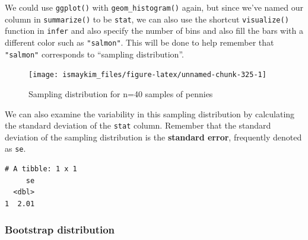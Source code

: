 \documentclass[12pt,]{krantz}
\makeatletter
\newenvironment{Shaded}{\begin{snugshade}}{\end{snugshade}}
\newcommand{\KeywordTok}[1]{\textcolor[rgb]{0.27,0.27,0.27}{\textbf{#1}}}
\newcommand{\DataTypeTok}[1]{\textcolor[rgb]{0.27,0.27,0.27}{#1}}
\newcommand{\DecValTok}[1]{\textcolor[rgb]{0.06,0.06,0.06}{#1}}
\newcommand{\StringTok}[1]{\textcolor[rgb]{0.5,0.5,0.5}{#1}}
\newcommand{\OperatorTok}[1]{\textcolor[rgb]{0.43,0.43,0.43}{\textbf{#1}}}
\newcommand{\NormalTok}[1]{#1}
\newenvironment{kframe}{%
\medskip{}
\setlength{\fboxsep}{.8em}
 \def\at@end@of@kframe{}%
 \ifinner\ifhmode%
  \def\at@end@of@kframe{\end{minipage}}%
  \begin{minipage}{\columnwidth}%
 \fi\fi%
 \def\FrameCommand##1{\hskip\@totalleftmargin \hskip-\fboxsep
 \colorbox{shadecolor}{##1}\hskip-\fboxsep
     \hskip-\linewidth \hskip-\@totalleftmargin \hskip\columnwidth}%
 \MakeFramed {\advance\hsize-\width
   \@totalleftmargin\z@ \linewidth\hsize
   \@setminipage}}%
 {\par\unskip\endMakeFramed%
 \at@end@of@kframe}
\renewenvironment{Shaded}{\begin{kframe}}{\end{kframe}}
\theoremstyle{definition}
\theoremstyle{definition}
\theoremstyle{definition}
\theoremstyle{remark}
\makeatother
\begin{document}
We could use \texttt{ggplot()} with \texttt{geom\_histogram()} again,
but since we've named our column in \texttt{summarize()} to be
\texttt{stat}, we can also use the shortcut \texttt{visualize()}
function in \texttt{infer} and also specify the number of bins and also
fill the bars with a different color such as \texttt{"salmon"}. This
will be done to help remember that \texttt{"salmon"} corresponds to
``sampling distribution''.

\begin{Shaded}
\end{Shaded}

\begin{figure}

{\centering \texttt{[image: ismaykim\_files/figure-latex/unnamed-chunk-325-1]} 

}

\caption{Sampling distribution for n=40 samples of pennies}\label{fig:unnamed-chunk-325}
\end{figure}

We can also examine the variability in this sampling distribution by
calculating the standard deviation of the \texttt{stat} column. Remember
that the standard deviation of the sampling distribution is the
\textbf{standard error}, frequently denoted as \texttt{se}.

\begin{Shaded}
\end{Shaded}

\begin{verbatim}
# A tibble: 1 x 1
     se
  <dbl>
1  2.01
\end{verbatim}

\subsubsection*{Bootstrap distribution}\label{bootstrap-distribution}
\end{document}
